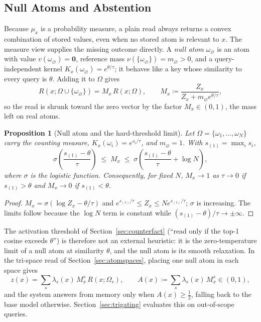 \documentclass[preprint,12pt]{elsarticle}
\newtheorem{proposition}{Proposition}
\newcommand{\Om}{\Omega}
\newif\ifmarkchanges
\newcommand{\rev}[1]{\ifmarkchanges{\color{blue}#1}\else#1\fi}
\begin{document}
\subsection{Null Atoms and Abstention}
\label{sec:null_atoms}

\rev{Because $\mu_x$ is a probability measure, a plain read always returns a convex combination of stored values, even when no stored atom is relevant to $x$. The measure view supplies the missing outcome directly. A \emph{null atom} $\omega_\varnothing$ is an atom with value $v(\omega_\varnothing)=\mathbf 0$, reference mass $\nu(\{\omega_\varnothing\})=m_\varnothing>0$, and a query-independent kernel $K_x(\omega_\varnothing)=e^{\theta/\tau}$; it behaves like a key whose similarity to every query is $\theta$. Adding it to $\Om$ gives
\[
  R(x;\Om\cup\{\omega_\varnothing\}) = M_x\,R(x;\Om), \qquad
  M_x \coloneqq \frac{Z_x}{Z_x+m_\varnothing e^{\theta/\tau}},
\]
so the read is shrunk toward the zero vector by the factor $M_x\in(0,1)$, the mass left on real atoms.}

\begin{proposition}[Null atom and the hard-threshold limit]
\label{prop:null_atom}
\rev{Let $\Om=\{\omega_1,\dots,\omega_N\}$ carry the counting measure, $K_x(\omega_i)=e^{s_i/\tau}$, and $m_\varnothing=1$. With $s_{(1)}=\max_i s_i$,
\[
  \sigma\!\left(\frac{s_{(1)}-\theta}{\tau}\right) \;\le\; M_x \;\le\; \sigma\!\left(\frac{s_{(1)}-\theta}{\tau}+\log N\right),
\]
where $\sigma$ is the logistic function. Consequently, for fixed $N$, $M_x\to 1$ as $\tau\to 0$ if $s_{(1)}>\theta$ and $M_x\to 0$ if $s_{(1)}<\theta$.}
\end{proposition}

\begin{proof}
\rev{$M_x=\sigma(\log Z_x-\theta/\tau)$ and $e^{s_{(1)}/\tau}\le Z_x\le N e^{s_{(1)}/\tau}$; $\sigma$ is increasing. The limits follow because the $\log N$ term is constant while $(s_{(1)}-\theta)/\tau\to\pm\infty$.} \qedhere
\end{proof}

\rev{The activation threshold of Section~\ref{sec:counterfact} (``read only if the top-1 cosine exceeds $\theta$'') is therefore not an external heuristic: it is the zero-temperature limit of a null atom at similarity $\theta$, and the null atom is its smooth relaxation. In the tri-space read of Section~\ref{sec:atomspaces}, placing one null atom in each space gives
\[
  z(x)=\sum_{s}\lambda_s(x)\,M_{x}^{s}\,R(x;\Om_s), \qquad A(x)\coloneqq\sum_s\lambda_s(x)\,M_x^s\in(0,1),
\]
and the system answers from memory only when $A(x)\ge\tfrac12$, falling back to the base model otherwise. Section~\ref{sec:trigating} evaluates this on out-of-scope queries.}
\end{document}
